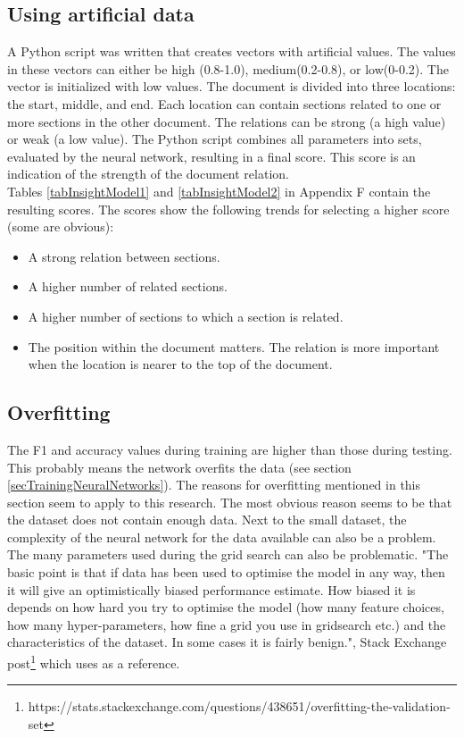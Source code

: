 {\subsection{Using artificial data}
A Python script was written that creates vectors with artificial values. The values in these vectors can either be high (0.8-1.0), medium(0.2-0.8), or low(0-0.2). The vector is initialized with low values. The document is divided into three locations: the start, middle, and end. Each location can contain sections related to one or more sections in the other document. The relations can be strong (a high value) or weak (a low value). The Python script combines all parameters into sets, evaluated by the neural network, resulting in a final score. This score is an indication of the strength of the document relation.\\

Tables \ref{tabInsightModel1} and  \ref{tabInsightModel2} in Appendix F contain the resulting scores. The scores show the following trends for selecting a higher score (some are obvious):
\begin{itemize}
  \item A strong relation between sections.
  \item A higher number of related sections.
  \item A higher number of sections to which a section is related.
  \item The position within the document matters. The relation is more important when the location is nearer to the top of the document.
\end{itemize}

\subsection{Overfitting}
The F1 and accuracy values during training are higher than those during testing. This probably means the network overfits the data (see section \ref{secTrainingNeuralNetworks}). The reasons for overfitting mentioned in this section seem to apply to this research. The most obvious reason seems to be that the dataset does not contain enough data. Next to the small dataset, the complexity of the neural network for the data available can also be a problem. \\

The many parameters used during the grid search can also be problematic. "The basic point is that if data has been used to optimise the model in any way, then it will give an optimistically biased performance estimate. How biased it is depends on how hard you try to optimise the model (how many feature choices, how many hyper-parameters, how fine a grid you use in gridsearch etc.) and the characteristics of the dataset. In some cases it is fairly benign.", Stack Exchange post\footnote{https://stats.stackexchange.com/questions/438651/overfitting-the-validation-set} which uses \citep{Nested-cross-validation} as a reference.\\

}
